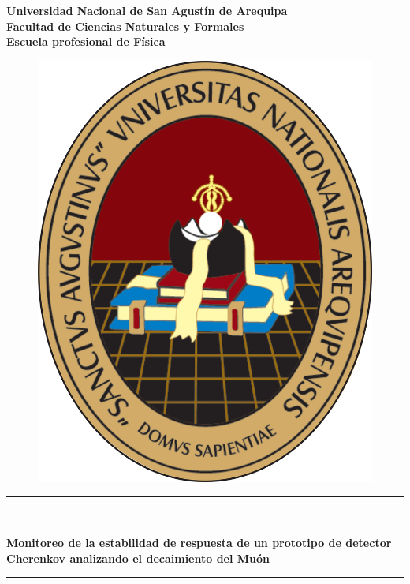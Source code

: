 \begin{titlepage}
	\begin{center}
		{\Large \textbf{Universidad Nacional de San Agustín de Arequipa}}\\
		{\Large \textbf{Facultad de Ciencias Naturales y Formales}}\\
		\vspace{1mm}
		{\Large \textbf{Escuela profesional de Física}}\\
		\begin{figure}[h]
			\centering
			\includegraphics[scale=0.3]{FIGURAS/Logo_unsa.png}
		\end{figure}
		\vspace{1mm}
		\rule{\linewidth}{0.75mm}\\
		\vspace{1mm}
		\begin{spacing}{1.5}
			{\LARGE \textbf{Monitoreo de la estabilidad de respuesta de un prototipo de detector Cherenkov analizando el decaimiento del Muón}}
		\end{spacing}
		\rule{\linewidth}{0.75mm}\\
	\end{center}


\end{titlepage}
